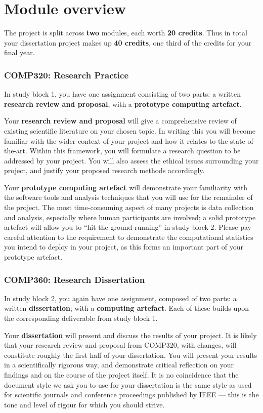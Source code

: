 \section*{Module overview}

The project is split across \textbf{two} modules, each worth \textbf{20 credits}.
Thus in total your dissertation project makes up \textbf{40 credits}, one third of the credits for your final year.

\subsubsection*{COMP320: Research Practice}

In study block 1, you have one assignment consisting of two parts: a written \textbf{research review and proposal},
with a \textbf{prototype computing artefact}.

Your \textbf{research review and proposal} will give a comprehensive review of existing scientific literature
on your chosen topic. In writing this you will become familiar with the wider context of your project
and how it relates to the state-of-the-art.
Within this framework, you will formulate a research question to be addressed by your project.
You will also assess the ethical issues surrounding your project, and justify your proposed research methods accordingly.

Your \textbf{prototype computing artefact} will demonstrate your familiarity with the software tools and analysis techniques
that you will use for the remainder of the project.
The most time-consuming aspect of many projects is data collection and analysis,
especially where human participants are involved;
a solid prototype artefact will allow you to ``hit the ground running'' in study block 2. Please pay careful attention
to the requirement to demonstrate the computational statistics you intend to deploy in your project, as this forms
an important part of your prototype artefact.

\subsubsection*{COMP360: Research Dissertation}

In study block 2, you again have one assignment, composed of two parts: a written \textbf{dissertation};
with a \textbf{computing artefact}. Each of these builds upon the corresponding deliverable from study block 1.

Your \textbf{dissertation} will present and discuss the results of your project.
It is likely that your research review and proposal from COMP320, with changes, will constitute roughly the first half
of your dissertation.
You will present your results in a scientifically rigorous way, and demonstrate critical reflection
on your findings and on the course of the project itself.
It is no coincidence that the document style we ask you to use for your dissertation is the same style
as used for scientific journals and conference proceedings published by IEEE ---
this is the tone and level of rigour for which you should strive.

